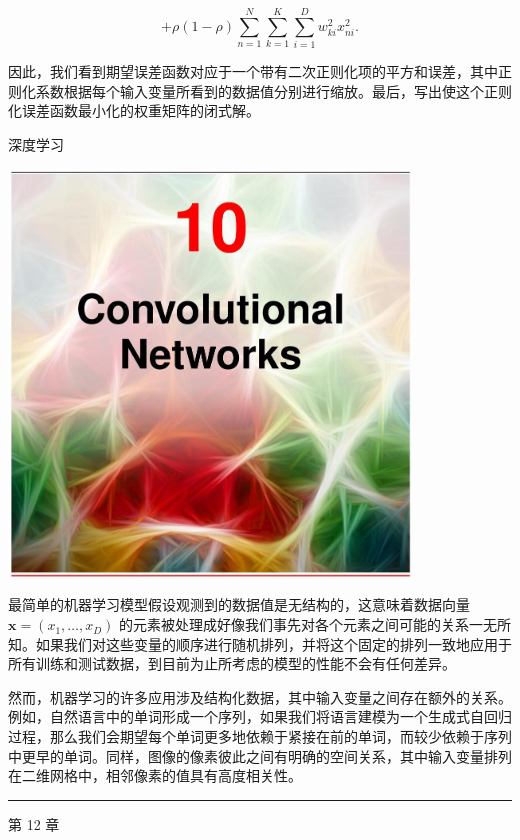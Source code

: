 \documentclass[10pt]{article}
\newcommand{\HRule}{\begin{center}\rule{0.9\linewidth}{0.2mm}\end{center}}
\begin{document}
\[
+ \rho \left( {1 - \rho }\right) \mathop{\sum }\limits_{{n = 1}}^{N}\mathop{\sum }\limits_{{k = 1}}^{K}\mathop{\sum }\limits_{{i = 1}}^{D}{w}_{ki}^{2}{x}_{ni}^{2}. \tag{9.73}
\]

因此，我们看到期望误差函数对应于一个带有二次正则化项的平方和误差，其中正则化系数根据每个输入变量所看到的数据值分别进行缩放。最后，写出使这个正则化误差函数最小化的权重矩阵的闭式解。

深度学习

\begin{center}
\includegraphics[max width=0.8\textwidth]{images/0194e279-9b28-703a-88f4-c3ac21e2010d_306_473_349_1075_1088_0.jpg}
\end{center}
\hspace*{3em} 

最简单的机器学习模型假设观测到的数据值是无结构的，这意味着数据向量 \(\mathbf{x} = \left( {{x}_{1},\ldots ,{x}_{D}}\right)\) 的元素被处理成好像我们事先对各个元素之间可能的关系一无所知。如果我们对这些变量的顺序进行随机排列，并将这个固定的排列一致地应用于所有训练和测试数据，到目前为止所考虑的模型的性能不会有任何差异。

然而，机器学习的许多应用涉及结构化数据，其中输入变量之间存在额外的关系。例如，自然语言中的单词形成一个序列，如果我们将语言建模为一个生成式自回归过程，那么我们会期望每个单词更多地依赖于紧接在前的单词，而较少依赖于序列中更早的单词。同样，图像的像素彼此之间有明确的空间关系，其中输入变量排列在二维网格中，相邻像素的值具有高度相关性。

\HRule

第 12 章
\end{document}
